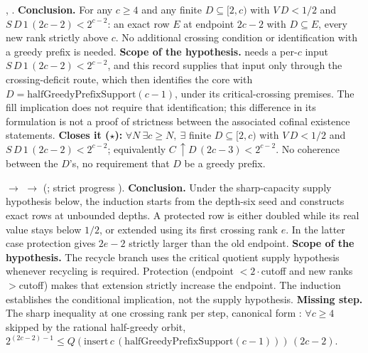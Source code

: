 \begin{obs}
,
.
\textbf{Conclusion.} For any $c \ge 4$ and any finite $D \subseteq [2,c)$ with
$\ensuremath{V}\,D < 1/2$ and $\ensuremath{S}\,D\,1\,(2c{-}2) <
2^{c-2}$: an exact row $E$ at endpoint $2c{-}2$ with $D \subseteq E$, every new rank strictly
above $c$.  No additional crossing condition or identification with a greedy prefix is needed.
\textbf{Scope of the hypothesis.} needs a per-$c$ input
$\ensuremath{S}\,D\,1\,(2c{-}2) < 2^{c-2}$, and this record supplies that
input only through the crossing-deficit route, which
then identifies the core with
$D=\mathrm{halfGreedyPrefixSupport}(c{-}1)$, under its critical-crossing
premises.  The fill implication does not require that identification;
this difference in its formulation is not a proof of strictness
between the associated cofinal existence statements.
\textbf{Closes it ($\star$):} $\forall N\ \exists c \ge N,\ \exists$ finite $D \subseteq [2,c)$
with $\ensuremath{V}\,D<1/2$ and $\ensuremath{S}\,D\,1\,(2c{-}2) <
2^{c-2}$; equivalently $\ensuremath{C}\,{\uparrow}D\,(2c{-}3) < 2^{c-2}$. No
coherence between the $D$'s, no requirement that $D$ be a greedy prefix.
\end{obs}

\begin{obs}
 $\to$
$\to$
(; strict
progress ).
\textbf{Conclusion.} Under the sharp-capacity supply hypothesis below,
the induction starts from the depth-six seed and constructs exact rows
at unbounded depths.  A protected row is either doubled while its real
value stays below $1/2$, or extended using its first crossing rank $e$.
In the latter case protection gives $2e-2$ strictly larger than the old
endpoint.
\textbf{Scope of the hypothesis.} The recycle branch uses the critical quotient supply
hypothesis whenever recycling is required.
Protection (endpoint $<2\cdot$cutoff and new ranks $>$cutoff) makes that
extension strictly increase the endpoint.  The induction establishes the
conditional implication, not the supply hypothesis.
\textbf{Missing step.} The sharp inequality at one crossing rank per step, canonical form
:
$\forall c \ge 4$ skipped by the rational half-greedy orbit, $2^{(2c-2)-1} \le
\ensuremath{Q}(\mathrm{insert}\,c\,(\mathrm{halfGreedyPrefixSupport}(c{-}1)))\,(2c{-}2)$.
\end{obs}

